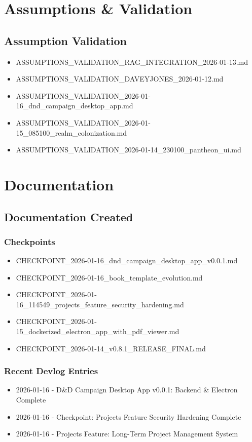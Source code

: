 \documentclass{book}
\begin{document}
\chapter{Assumptions \& Validation}

\section{Assumption Validation}
\begin{itemize}
\item ASSUMPTIONS\_VALIDATION\_RAG\_INTEGRATION\_2026-01-13.md
\item ASSUMPTIONS\_VALIDATION\_DAVEYJONES\_2026-01-12.md
\item ASSUMPTIONS\_VALIDATION\_2026-01-16\_dnd\_campaign\_desktop\_app.md
\item ASSUMPTIONS\_VALIDATION\_2026-01-15\_085100\_realm\_colonization.md
\item ASSUMPTIONS\_VALIDATION\_2026-01-14\_230100\_pantheon\_ui.md
\end{itemize}

\chapter{Documentation}

\section{Documentation Created}
\subsection{Checkpoints}
\begin{itemize}
\item CHECKPOINT\_2026-01-16\_dnd\_campaign\_desktop\_app\_v0.0.1.md
\item CHECKPOINT\_2026-01-16\_book\_template\_evolution.md
\item CHECKPOINT\_2026-01-16\_114549\_projects\_feature\_security\_hardening.md
\item CHECKPOINT\_2026-01-15\_dockerized\_electron\_app\_with\_pdf\_viewer.md
\item CHECKPOINT\_2026-01-14\_v0.8.1\_RELEASE\_FINAL.md
\end{itemize}

\subsection{Recent Devlog Entries}
\begin{itemize}
\item 2026-01-16 - D\&D Campaign Desktop App v0.0.1: Backend \& Electron Complete
\item 2026-01-16 - Checkpoint: Projects Feature Security Hardening Complete
\item 2026-01-16 - Projects Feature: Long-Term Project Management System
\end{itemize}
\end{document}
